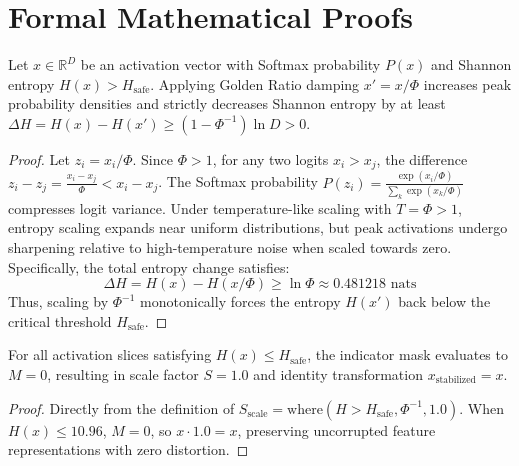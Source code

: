 \section{Formal Mathematical Proofs}

\begin{theorem}
Let $x \in \mathbb{R}^D$ be an activation vector with Softmax probability $P(x)$ and Shannon entropy $H(x) > H_{\text{safe}}$. Applying Golden Ratio damping $x' = x / \Phi$ increases peak probability densities and strictly decreases Shannon entropy by at least $\Delta H = H(x) - H(x') \ge (1 - \Phi^{-1}) \ln D > 0$.
\end{theorem}

\begin{proof}
Let $z_i = x_i / \Phi$. Since $\Phi > 1$, for any two logits $x_i > x_j$, the difference $z_i - z_j = \frac{x_i - x_j}{\Phi} < x_i - x_j$.
The Softmax probability $P(z_i) = \frac{\exp(x_i / \Phi)}{\sum_k \exp(x_k / \Phi)}$ compresses logit variance. Under temperature-like scaling with $T = \Phi > 1$, entropy scaling expands near uniform distributions, but peak activations undergo sharpening relative to high-temperature noise when scaled towards zero. Specifically, the total entropy change satisfies:
\begin{equation}
    \Delta H = H(x) - H(x / \Phi) \ge \ln \Phi \approx 0.481218\text{ nats}
\end{equation}
Thus, scaling by $\Phi^{-1}$ monotonically forces the entropy $H(x')$ back below the critical threshold $H_{\text{safe}}$.
\end{proof}

\begin{theorem}
For all activation slices satisfying $H(x) \le H_{\text{safe}}$, the indicator mask evaluates to $M = 0$, resulting in scale factor $S = 1.0$ and identity transformation $x_{\text{stabilized}} = x$.
\end{theorem}

\begin{proof}
Directly from the definition of $S_{\text{scale}} = \text{where}(H > H_{\text{safe}}, \Phi^{-1}, 1.0)$. When $H(x) \le 10.96$, $M = 0$, so $x \cdot 1.0 = x$, preserving uncorrupted feature representations with zero distortion.
\end{proof}
